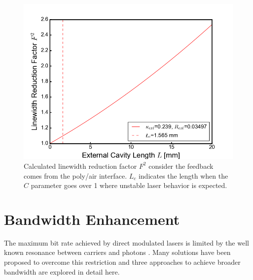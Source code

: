 \begin{figure}[ht]
    \centering
    \includegraphics[width=.7\linewidth]{figures/F_reduction_factor.png}
    \caption{Calculated linewidth reduction factor $F^2$ consider the feedback comes from the poly/air interface. $L_c$ indicates the length when the $C$ parameter goes over 1 where unstable laser behavior is expected.}
    \label{fig:F_reduction_factor}
\end{figure}

\section{Bandwidth Enhancement}\label{sec:bandwidth_enhancement}
The maximum bit rate achieved by direct modulated lasers is limited by the well known resonance between carriers and photons \cite{coldren2012diode}. Many solutions have been proposed to overcome this restriction and three approaches to achieve broader bandwidth are explored in detail here. 

